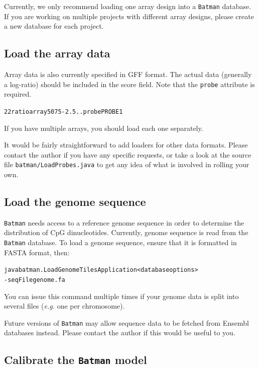 \documentclass[a4paper, 11pt]{article}
\newcommand{\bm}{{\tt Batman}\xspace}
\begin{document}
Currently, we only recommend loading one array design into a \bm database.  If you
are working on multiple projects with different array designs, please create a new
database for each project.

\subsection{Load the array data}

Array data is also currently specified in GFF format.  The actual data (generally
a log-ratio) should be included in the score field.  Note that the {\tt probe}
attribute is required.

\begin{alltt}22  ratio   array   50  75  -2.5   .   .   probe PROBE1\end{alltt}

If you have multiple arrays, you should load each one separately.

It would be fairly straightforward to add loaders for other data formats.  Please
contact the author if you have any specific requests, or take a look at the source
file {\tt batman/LoadProbes.java} to get any idea of what is involved in rolling
your own.

\subsection{Load the genome sequence}

\bm needs access to a reference genome sequence in order to determine the distribution
of CpG dinucleotides.  Currently, genome sequence is read from the \bm database.  To
load a genome sequence, ensure that it is formatted in FASTA format, then:

\begin{alltt}    java batman.LoadGenomeTilesApplication <database options>
         -seqFile genome.fa\end{alltt} 

You can issue this command multiple times if your genome data is split into
several files ({\it e.g.} one per chromosome).

Future versions of \bm may allow sequence data to be fetched from Ensembl databases
instead.  Please contact the author if this would be useful to you.

\subsection{Calibrate the \bm model}
\end{document}
